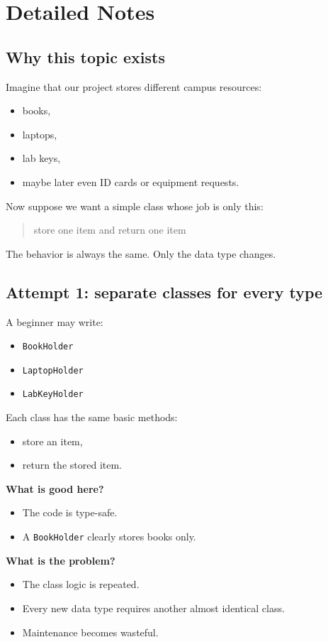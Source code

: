 \documentclass[11pt]{article}
\begin{document}
\section{Detailed Notes}
\subsection{Why this topic exists}
Imagine that our project stores different campus resources:
\begin{itemize}
  \item books,
  \item laptops,
  \item lab keys,
  \item maybe later even ID cards or equipment requests.
\end{itemize}

Now suppose we want a simple class whose job is only this:
\begin{quote}
store one item and return one item
\end{quote}

The behavior is always the same.
Only the data type changes.

\subsection{Attempt 1: separate classes for every type}
A beginner may write:
\begin{itemize}
  \item \texttt{BookHolder}
  \item \texttt{LaptopHolder}
  \item \texttt{LabKeyHolder}
\end{itemize}

Each class has the same basic methods:
\begin{itemize}
  \item store an item,
  \item return the stored item.
\end{itemize}

\textbf{What is good here?}
\begin{itemize}
  \item The code is type-safe.
  \item A \texttt{BookHolder} clearly stores books only.
\end{itemize}

\textbf{What is the problem?}
\begin{itemize}
  \item The class logic is repeated.
  \item Every new data type requires another almost identical class.
  \item Maintenance becomes wasteful.
\end{itemize}
\end{document}
